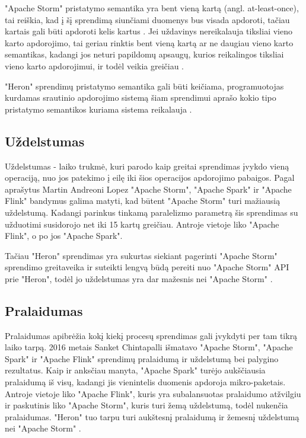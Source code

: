 \documentclass{VUMIFPSbakalaurinis}
\begin{document}
"Apache Storm" pristatymo semantika yra bent vieną kartą (angl. at-least-once), tai reiškia, kad į šį sprendimą siunčiami duomenys bus visada apdoroti, tačiau kartais gali būti apdoroti kelis kartus \cite{prithi20}. Jei uždavinys nereikalauja tiksliai vieno karto apdorojimo, tai geriau rinktis bent vieną kartą ar ne daugiau vieno karto semantikas, kadangi jos neturi papildomų apsaugų, kurios reikalingos tiksliai vieno karto apdorojimui, ir todėl veikia greičiau \cite{zhang20}. \par

"Heron" sprendimų pristatymo semantika gali būti keičiama, programuotojas kurdamas srautinio apdorojimo sistemą šiam sprendimui aprašo kokio tipo pristatymo semantikos kuriama sistema reikalauja \cite{delivery-semantics}.

\subsection{Uždelstumas}

Uždelstumas - laiko trukmė, kuri parodo kaip greitai sprendimas įvykdo vieną operaciją, nuo jos patekimo į eilę iki šios operacijos apdorojimo pabaigos. Pagal \cite{Lopez2016APC} aprašytus Martin Andreoni Lopez "Apache Storm", "Apache Spark" ir "Apache Flink" bandymus galima matyti, kad būtent "Apache Storm" turi mažiausią uždelstumą. Kadangi parinkus tinkamą paralelizmo parametrą šis sprendimas su užduotimi susidorojo net iki 15 kartų greičiau. Antroje vietoje liko "Apache Flink", o po jos "Apache Spark". \par

Tačiau "Heron" sprendimas yra sukurtas siekiant pagerinti "Apache Storm" sprendimo greitaveika ir suteikti lengvą būdą pereiti nuo "Apache Storm" API prie "Heron", todėl jo uždelstumas yra dar mažesnis nei "Apache Storm" \cite{Kulkarni:2015:THS:2723372.2742788}.

\subsection{Pralaidumas}

Pralaidumas apibrėžia kokį kiekį procesų sprendimas gali įvykdyti per tam tikrą laiko tarpą. 2016 metais Sanket Chintapalli \cite{chintapalli2016benchmarking} išmatavo "Apache Storm", "Apache Spark" ir "Apache Flink" sprendimų pralaidumą ir uždelstumą bei palygino rezultatus. Kaip ir anksčiau manyta, "Apache Spark" turėjo aukščiausia pralaidumą iš visų, kadangi jis vienintelis duomenis apdoroja mikro-paketais. Antroje vietoje liko "Apache Flink", kuris yra subalansuotas pralaidumo atžvilgiu ir paskutinis liko "Apache Storm", kuris turi žemą uždelstumą, todėl nukenčia pralaidumas. "Heron" tuo tarpu turi aukštesnį pralaidumą ir žemesnį uždelstumą nei "Apache Storm" \cite{TwitterHeron}. 
\end{document}
